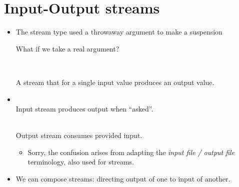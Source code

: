 \documentclass{beamer}
\newcommand{\tmem}[1]{{\em #1\/}}
\begin{document}
\section{Input-Output streams}

\begin{itemize}
  \item The stream type used a throwaway argument to make a suspension
  
  {}{}{\hlopt{= }}{}{\hlopt{\textbar }}{}{}{}{\hlopt{*
  (}}{}{\hlopt{-> }}{}{\hlopt{)}}{\hlendline{}}
  
  What if we take a real argument?
  
  {}{\hlopt{(}}{}{\hlopt{, }}{}{\hlopt{)
  }}{}{\hlopt{=}}{\hlendline{}}\\
  {\hlstd{ \ }}{}{\hlopt{\textbar }}{}{}{}{\hlopt{* (}}{}{\hlopt{-> (}}{}{\hlopt{,
  }}{}{\hlopt{) }}{}{\hlopt{)}}{\hlendline{}}
  
  A stream that for a single input value produces an output value.
  
  \item {}{}{\hlopt{=
  (}}{}{\hlopt{, }}{}{\hlopt{)
  }}{}{\hlendline{}}\\
  Input stream produces output when ``asked''.
  
  {}{}{\hlopt{= (}}{}{\hlopt{,
  }}{}{\hlopt{) }}{}{\hlendline{}}\\
  Output stream consumes provided input.
  \begin{itemize}
    \item Sorry, the confusion arises from adapting the {\tmem{input file /
    output file}} terminology, also used for streams.
  \end{itemize}
  \item We can compose streams: directing output of one to input of another.
  

\end{itemize}
\end{document}
